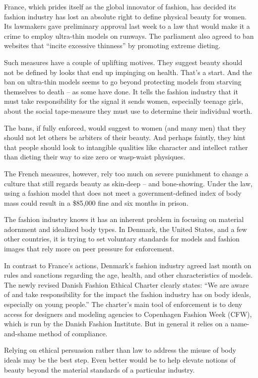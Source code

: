 France, which prides itself as the global innovator of fashion, has decided its fashion industry has lost an absolute right to define physical beauty for women. Its lawmakers gave preliminary approval last week to a law that would make it a crime to employ ultra-thin models on runways. The parliament also agreed to ban websites that ``incite excessive thinness'' by promoting extreme dieting.


Such measures have a couple of uplifting motives. They suggest beauty should not be defined by looks that end up impinging on health. That's a start. And the ban on ultra-thin models seems to go beyond protecting models from starving themselves to death – as some have done. It tells the fashion industry that it must take responsibility for the signal it sends women, especially teenage girls, about the social tape-measure they must use to determine their individual worth.


The bans, if fully enforced, would suggest to women (and many men) that they should not let others be arbiters of their beauty. And perhaps faintly, they hint that people should look to intangible qualities like character and intellect rather than dieting their way to size zero or wasp-waist physiques.


The French measures, however, rely too much on severe punishment to change a culture that still regards beauty as skin-deep – and bone-showing. Under  the law, using a fashion model that does not meet a government-defined index of body mass could result in a \$85,000 fine and six months in prison.


The fashion industry knows it has an inherent problem in focusing on material adornment and idealized body types. In Denmark, the United States, and a few other countries, it is trying to set voluntary standards for models and fashion images that rely more on peer pressure for enforcement.


In contrast to France's actions, Denmark's fashion industry agreed last month on rules and sanctions regarding the age, health, and other characteristics of models. The newly revised Danish Fashion Ethical Charter clearly states: ``We are aware of and take responsibility for the impact the fashion industry has on body ideals, especially on young people.'' The charter's main tool of enforcement is to deny access for designers and modeling agencies to Copenhagen Fashion Week (CFW), which is run by the Danish Fashion Institute. But in general it relies on a name-and-shame method of compliance.


Relying on ethical persuasion rather than law to address the misuse of body ideals may be the best step. Even better would be to help elevate notions of beauty beyond the material standards of a particular industry.